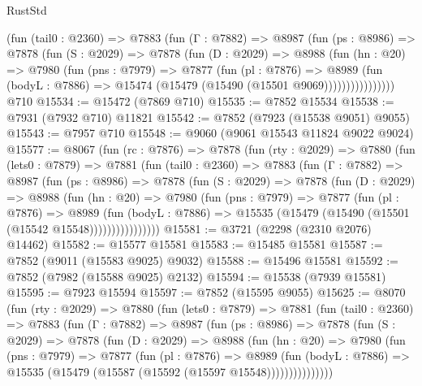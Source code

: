 \begin{lexlean}{RustStd}
\begin{coremodule}
            (fun (tail0 : @2360) =>
            @7883
              (fun (Γ : @7882) =>
              @8987
                (fun (ps : @8986) =>
                @7878
                  (fun (S : @2029) =>
                  @7878
                    (fun (D : @2029) =>
                    @8988
                      (fun (hn : @20) =>
                      @7980
                        (fun (pns : @7979) =>
                        @7877
                          (fun (pl : @7876) =>
                          @8989
                            (fun (bodyL : @7886) =>
                            @15474 (@15479 (@15490 (@15501 @9069))))))))))))))))
    @710
@15534 := @15472 (@7869 @710)
@15535 := @7852 @15534
@15538 := @7931 (@7932 @710) @11821
@15542 := @7852 (@7923 (@15538 @9051) @9055)
@15543 := @7957 @710
@15548 := @9060 (@9061 @15543 @11824 @9022 @9024)
@15577 := @8067
    (fun (rc : @7876) =>
    @7878
      (fun (rty : @2029) =>
      @7880
        (fun (lets0 : @7879) =>
        @7881
          (fun (tail0 : @2360) =>
          @7883
            (fun (Γ : @7882) =>
            @8987
              (fun (ps : @8986) =>
              @7878
                (fun (S : @2029) =>
                @7878
                  (fun (D : @2029) =>
                  @8988
                    (fun (hn : @20) =>
                    @7980
                      (fun (pns : @7979) =>
                      @7877
                        (fun (pl : @7876) =>
                        @8989
                          (fun (bodyL : @7886) =>
                          @15535 (@15479 (@15490 (@15501 (@15542 @15548))))))))))))))))
@15581 := @3721 (@2298 (@2310 @2076) @14462)
@15582 := @15577 @15581
@15583 := @15485 @15581
@15587 := @7852 (@9011 (@15583 @9025) @9032)
@15588 := @15496 @15581
@15592 := @7852 (@7982 (@15588 @9025) @2132)
@15594 := @15538 (@7939 @15581)
@15595 := @7923 @15594
@15597 := @7852 (@15595 @9055)
@15625 := @8070
    (fun (rty : @2029) =>
    @7880
      (fun (lets0 : @7879) =>
      @7881
        (fun (tail0 : @2360) =>
        @7883
          (fun (Γ : @7882) =>
          @8987
            (fun (ps : @8986) =>
            @7878
              (fun (S : @2029) =>
              @7878
                (fun (D : @2029) =>
                @8988
                  (fun (hn : @20) =>
                  @7980
                    (fun (pns : @7979) =>
                    @7877
                      (fun (pl : @7876) =>
                      @8989
                        (fun (bodyL : @7886) =>
                        @15535 (@15479 (@15587 (@15592 (@15597 @15548)))))))))))))))

\end{coremodule}
\end{lexlean}
